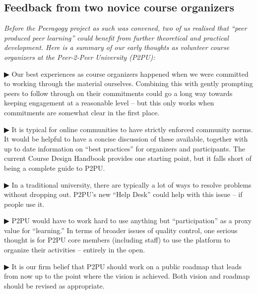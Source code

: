 \begin{mdframed}
\subsection{Feedback from two novice course organizers}

\emph{Before the Peeragogy project as such was convened, two of us
  realised that ``peer produced peer learning'' could benefit from
  further theoretical and practical development.  Here is a summary of
  our early thoughts as volunteer course organizers at the Peer-2-Peer
  University (P2PU):}

▶ Our best experiences as course organizers happened when we were committed to working through the material ourselves. Combining this with gently prompting peers to follow through on their commitments could go a long way towards keeping engagement at a reasonable level – but this only works when commitments are somewhat clear in the first place. 

▶ It is typical for online communities to have strictly enforced community norms. It would be helpful to have a concise discussion of these available, together with up to date information on “best practices” for organizers and participants. The current Course Design Handbook provides one starting point, but it falls short of being a complete guide to P2PU.

▶ In a traditional university, there are typically a lot of ways to resolve problems without dropping out. P2PU’s new “Help Desk” could help with this issue -- if people use it.

▶ P2PU would have to work hard to use anything but “participation” as a proxy value for ``learning.'' In terms of broader issues of quality control, one serious thought is for P2PU core members (including staff) to use the platform to organize their activities – entirely in the open.

▶ It is our firm belief that P2PU should work on a public roadmap that leads from now up to the point where the vision is achieved. Both vision and roadmap should be revised as appropriate.
\end{mdframed}

